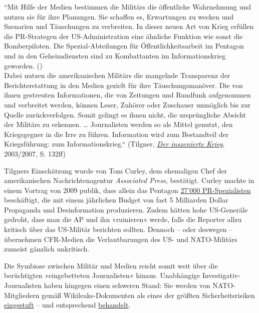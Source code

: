 ``Mit Hilfe der Medien bestimmen die Militärs die öffentliche
Wahrnehmung und nutzen sie für ihre Planungen. Sie schaffen es,
Erwartungen zu wecken und Szenarien und Täuschungen zu verbreiten. In
dieser neuen Art von Krieg erfüllen die PR-Strategen der
US-Administration eine ähnliche Funktion wie sonst die Bomberpiloten.
Die Spezial-Abteilungen für Öffentlich­keits­­arbeit im Pentagon und in
den Geheim­diensten sind zu Kombattanten im Informationskrieg geworden.
()\\
Dabei nutzen die amerikanischen Militärs die mangelnde Transparenz der
Bericht­erstattung in den Medien gezielt für ihre Täuschungs­­manöver.
Die von ihnen gestreuten Informationen, die von Zeitungen und Rundfunk
aufgenommen und verbreitet werden, können Leser, Zuhörer oder Zuschauer
unmöglich bis zur Quelle zurückverfolgen. Somit gelingt es ihnen nicht,
die ursprüngliche Absicht der Militärs zu erkennen. \ldots{}
Journalisten werden so als Mittel genutzt, den Kriegsgegner in die Irre
zu führen. Information wird zum Bestandteil der Kriegsführung: zum
Informationskrieg.`` (Tilgner,
\emph{\href{https://www.amazon.de/inszenierte-Krieg-T\%C3\%A4uschung-Wahrheit-Husseins/dp/3871344923}{Der
inszenierte Krieg},} 2003/2007, S. 132ff)

Tilgners Einschätzung wurde von Tom Curley, dem ehemaligen Chef der
amerikanischen Nachrichten­agentur \emph{Associated Press}, bestätigt.
Curley machte in einem Vortrag von 2009 publik, dass allein das Pentagon
\href{http://www.tagesanzeiger.ch/ausland/amerika/27000-PRBerater-polieren-Image-der-USA/story/20404513}{27'000
PR-Spezialisten} beschäftigt, die mit einem jährlichen Budget von fast 5
Milliarden Dollar Propaganda und Desinformation produzieren. Zudem
hätten hohe US-Generäle gedroht, dass man die AP und ihn »ruinieren«
werde, falls die Reporter allzu kritisch über das US-Militär berichten
sollten. Dennoch -- oder deswegen -- übernehmen CFR-Medien die
Verlautbarungen des US- und NATO-Militärs zumeist gänzlich unkritisch.

Die Symbiose zwischen Militär und Medien reicht somit weit über die
berüchtigten »eingebetteten Journalisten« hinaus. Unabhängige
Investigativ-Journalisten haben hingegen einen schweren Stand: Sie
werden von NATO-Mitgliedern gemäß Wikileaks-Dokumenten als eines der
größten Sicherheits­risiken
\href{https://youtu.be/WCWdwlkx-rE?t=1h18m35s}{eingestuft} -- und
entsprechend
\href{http://www.zerohedge.com/news/2017-08-28/journalist-interrogated-fired-story-linking-cia-and-syria-weapons-flights}{behandelt}.

